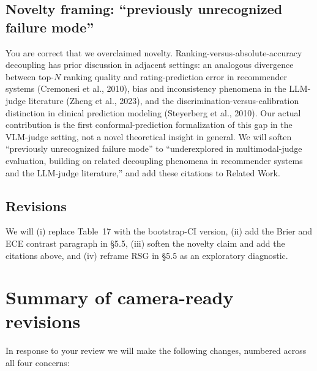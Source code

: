 \documentclass[11pt]{article}
\begin{document}
\subsection*{Novelty framing: ``previously unrecognized failure mode''}

You are correct that we overclaimed novelty. Ranking-versus-absolute-accuracy decoupling has prior discussion in adjacent settings: an analogous divergence between top-$N$ ranking quality and rating-prediction error in recommender systems (Cremonesi et al., 2010), bias and inconsistency phenomena in the LLM-judge literature (Zheng et al., 2023), and the discrimination-versus-calibration distinction in clinical prediction modeling (Steyerberg et al., 2010). Our actual contribution is the first conformal-prediction formalization of this gap in the VLM-judge setting, not a novel theoretical insight in general. We will soften ``previously unrecognized failure mode'' to ``underexplored in multimodal-judge evaluation, building on related decoupling phenomena in recommender systems and the LLM-judge literature,'' and add these citations to Related Work.

\subsection*{Revisions}

We will (i) replace Table~17 with the bootstrap-CI version, (ii) add the Brier and ECE contrast paragraph in \S 5.5, (iii) soften the novelty claim and add the citations above, and (iv) reframe RSG in \S 5.5 as an exploratory diagnostic.

\section*{Summary of camera-ready revisions}

In response to your review we will make the following changes, numbered across all four concerns:
\end{document}
